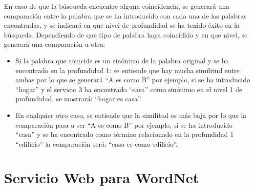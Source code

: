 En caso de que la búsqueda encuentre alguna coincidencia, se generará una comparación entre la palabra que se ha introducido con cada una de las palabras encontradas, y se indicará en que nivel de profundidad se ha tenido éxito en la búsqueda. Dependiendo de que tipo de palabra haya coincidido y en que nivel, se generará una comparación u otra:
\begin{itemize}
	\item Si la palabra que coincide es un sinónimo de la palabra original  y se ha encontrado en la profundidad 1: se entiende que hay mucha similitud entre ambas por lo que se generará ``A es como B'' por ejemplo, si se ha introducido ``hogar'' y el servicio 3 ha encontrado ``casa'' como sinónimo en el nivel 1 de profundidad, se mostrará: ``hogar es casa''.
	
	\item En cualquier otro caso, se entiende que la similitud es más baja por lo que la comparación pasa a ser ``A es como B'' por ejemplo, si se ha introducido ``casa'' y se ha encontrado como término relacionado en la profundidad 1 ``edificio'' la comparación será: ``casa es como edificio''.
\end{itemize}


\section{Servicio Web para WordNet}
\label{cap:sec:servicioWordnet}

